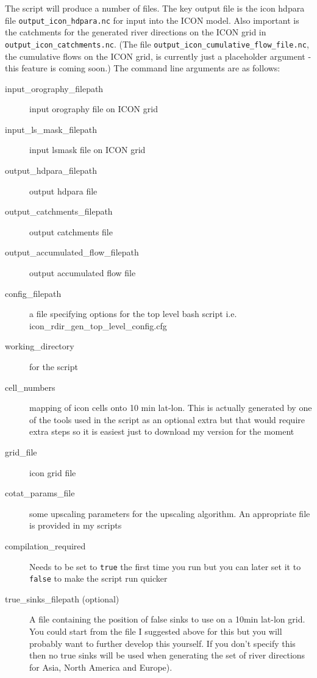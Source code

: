 \documentclass{article}
\begin{document}
The script will produce a number of files. The key output file is the icon hdpara file  \lstinline[style=bash_input]{output_icon_hdpara.nc} for input into the ICON model. Also important is the catchments for the generated river directions on the ICON grid in  \lstinline[style=bash_input]{output_icon_catchments.nc}. (The file \lstinline[style=bash_input]{output_icon_cumulative_flow_file.nc}, the cumulative flows on the ICON grid, is currently just a placeholder argument - this feature is coming soon.) The command line arguments are as follows:
\begin{description}
\item[input\_orography\_filepath] input orography file on ICON grid
\item[input\_ls\_mask\_filepath] input lsmask file on ICON grid
\item[output\_hdpara\_filepath] output hdpara file 
\item[output\_catchments\_filepath] output catchments file
\item[output\_accumulated\_flow\_filepath] output accumulated flow file
\item[config\_filepath] a file specifying options for the top level bash script i.e. icon\_rdir\_gen\_top\_level\_config.cfg
\item[working\_directory] for the script
\item[cell\_numbers] mapping of icon cells onto 10 min lat-lon. This is actually generated by one of the tools used in the script as an optional extra but that would require extra steps so it is easiest just to download my version for the moment
\item[grid\_file] icon grid file
\item[cotat\_params\_file] some upscaling parameters for the upscaling algorithm. An appropriate file is provided in my scripts
\item[compilation\_required]  Needs to be set to \lstinline[style=bash_input]{true} the first time you run but you can later set it to \lstinline[style=bash_input]{false} to make the script run quicker
\item[true\_sinks\_filepath (optional)] A file containing the position of false sinks to use on a 10min lat-lon grid. You could start from the file I suggested above for this but you will probably want to further develop this yourself. If you don't specify this then no true sinks will be used when generating the set of river directions for Asia, North America and Europe).
\end{description}
\end{document}
